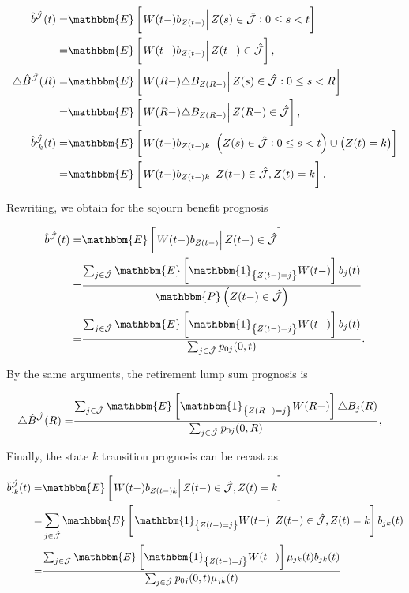 \documentclass{article}
\newcommand{\1}[1]{\mathbbm{1}_{\left\lbrace #1 \right\rbrace}}
\newcommand{\expec}[1][def]{\mathbbm{E} \left[ #1 \right]}
\newcommand{\econd}[2][def]{\mathbbm{E} \left[ \left. #1 \right| #2 \right]}
\newcommand{\probability}[1][def]{\mathbbm{P} \left( #1 \right)}
\theoremstyle{break}
\theoremstyle{remark}
\numberwithin{equation}{section}
\begin{document}
\begin{align*}
\hat{b}^{\hat{\mathcal{J}}}(t) =& \econd[W(t-) b_{Z(t-)}]{Z(s) \in \hat{\mathcal{J}} : 0 \leq s < t} \\
=& \econd[W(t-) b_{Z(t-)}]{Z(t-) \in \hat{\mathcal{J}}}, \\
\triangle \hat{B}^{\hat{\mathcal{J}}}(R) =& \econd[W(R-) \triangle B_{Z(R-)}]{Z(s) \in \hat{\mathcal{J}} : 0 \leq s < R} \\
=& \econd[W(R-) \triangle B_{Z(R-)}]{Z(R-) \in \hat{\mathcal{J}}}, \\
\hat{b}^{\hat{\mathcal{J}}}_{\cdot k}(t) =& \econd[W(t-) b_{Z(t-)k}]{\left( Z(s) \in \hat{\mathcal{J}} : 0 \leq s < t\right) \cup \left(Z(t) = k \right)} \\
=& \econd[W(t-) b_{Z(t-)k}]{Z(t-) \in \hat{\mathcal{J}}, Z(t) = k }.
\end{align*}

Rewriting, we obtain for the sojourn benefit prognosis

\begin{align} \label{One}
	 \hat{b}^{\hat{\mathcal{J}}}(t) =& \econd[W(t-)b_{Z(t-)}]{Z(t-) \in \hat{\mathcal{J}}} \nonumber \\
	 =&\frac{\sum_{j \in \hat{\mathcal{J}}} \expec[\1{Z(t-)=j} W(t-)] b_j(t)}{\probability[Z(t-) \in \hat{\mathcal{J}}]} \nonumber \\
	 =&\frac{\sum_{j \in \hat{\mathcal{J}}} \expec[\1{Z(t-)=j} W(t-)] b_j(t)}{\sum_{j \in \hat{\mathcal{J}}} p_{0j}(0,t)}.
\end{align}

By the same arguments, the retirement lump sum prognosis is

\begin{align} \label{Two}
\triangle \hat{B}^{\hat{\mathcal{J}}}(R) =& \frac{\sum_{j \in \hat{\mathcal{J}}} \expec[\1{Z(R-)=j} W(R-)] \triangle B_j(R)}{\sum_{j \in \hat{\mathcal{J}}} p_{0j}(0,R)},
\end{align}

Finally, the state $k$ transition prognosis can be recast as

\begin{align} \label{Three}
\hat{b}_{\cdot k}^{\hat{\mathcal{J}}}(t) =& \econd[W(t-)b_{Z(t-)k}]{Z(t-) \in \hat{\mathcal{J}}, Z(t)=k} \nonumber \\
=& \sum_{j \in \hat{\mathcal{J}}} \econd[\1{Z(t-)=j} W(t-)]{Z(t-) \in \hat{\mathcal{J}}, Z(t) = k} b_{jk}(t) \nonumber \\
=& \frac{\sum_{j \in \hat{\mathcal{J}}} \expec[\1{Z(t-)=j} W(t-)] \mu_{jk}(t) b_{jk}(t)}{\sum_{j \in \hat{\mathcal{J}}} p_{0j}(0,t) \mu_{jk}(t)}
\end{align}
\end{document}
